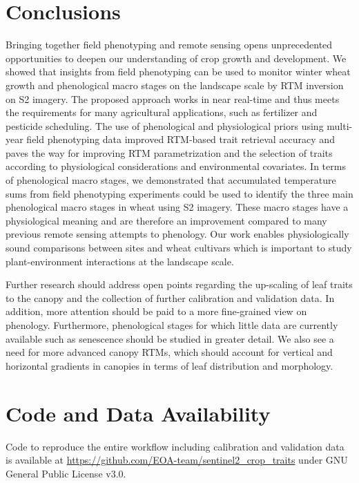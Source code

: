 \section{Conclusions}
\label{sec:insights_conclusions}
% 
Bringing together field phenotyping and remote sensing opens unprecedented opportunities to deepen our understanding of crop growth and development.
We showed that insights from field phenotyping can be used to monitor winter wheat growth and phenological macro stages on the landscape scale by \gls{RTM} inversion on \gls{S2} imagery. The proposed approach works in near real-time and thus meets the requirements for many agricultural applications, such as fertilizer and pesticide scheduling. The use of phenological and physiological priors using multi-year field phenotyping data improved RTM-based trait retrieval accuracy and paves the way for improving \gls{RTM} parametrization and the selection of traits according to physiological considerations and environmental covariates. In terms of phenological macro stages, we demonstrated that accumulated temperature sums from field phenotyping experiments could be used to identify the three main phenological macro stages in wheat using \gls{S2} imagery. These macro stages have a physiological meaning and are therefore an improvement compared to many previous remote sensing attempts to phenology. Our work enables physiologically sound comparisons between sites and wheat cultivars which is important to study plant-environment interactions at the landscape scale.

Further research should address open points regarding the up-scaling of leaf traits to the canopy and the collection of further calibration and validation data. In addition, more attention should be paid to a more fine-grained view on phenology. Furthermore, phenological stages for which little data are currently available such as senescence should be studied in greater detail. We also see a need for more advanced canopy RTMs, which should account for vertical and horizontal gradients in canopies in terms of leaf distribution and morphology.

\section*{Code and Data Availability}
\label{sec:insights_code-data-availability}
Code to reproduce the entire workflow including calibration and validation data is available at \url{https://github.com/EOA-team/sentinel2_crop_traits} under GNU General Public License v3.0.

